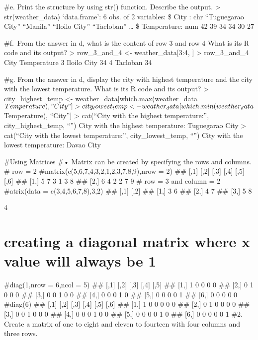 \documentclass[
]{article}
\begin{document}
\#e. Print the structure by using str() function. Describe the output.
\textgreater{} str(weather\_data) `data.frame': 6 obs. of 2 variables:
\$ City : chr ``Tuguegarao City'' ``Manila'' ``Iloilo City''
``Tacloban'' \ldots{} \$ Temperature: num 42 39 34 34 30 27

\#f.~From the answer in d, what is the content of row 3 and row 4 What
is its R code and its output? \textgreater{} row\_3\_and\_4 \textless-
weather\_data{[}3:4, {]} \textgreater{} row\_3\_and\_4 City Temperature
3 Iloilo City 34 4 Tacloban 34

\#g. From the answer in d, display the city with highest temperature and
the city with the lowest temperature. What is its R code and its output?
\textgreater{} city\_highest\_temp \textless-
weather\_data{[}which.max(weather\_data\(Temperature), "City"] > city_lowest_temp <- weather_data[which.min(weather_data\)Temperature),
``City''{]} \textgreater{} cat(``City with the highest temperature:'',
city\_highest\_temp, ``\n'') City with the highest temperature:
Tuguegarao City \textgreater{} cat(``City with the lowest
temperature:'', city\_lowest\_temp, ``\n'') City with the lowest
temperature: Davao City

\#Using Matrices \#• Matrix can be created by specifying the rows and
columns. \# row = 2 \#matrix(c(5,6,7,4,3,2,1,2,3,7,8,9),nrow = 2) \#\#
{[},1{]} {[},2{]} {[},3{]} {[},4{]} {[},5{]} {[},6{]} \#\# {[}1,{]} 5 7
3 1 3 8 \#\# {[}2,{]} 6 4 2 2 7 9 \# row = 3 and column = 2 \#atrix(data
= c(3,4,5,6,7,8),3,2) \#\# {[},1{]} {[},2{]} \#\# {[}1,{]} 3 6 \#\#
{[}2,{]} 4 7 \#\# {[}3,{]} 5 8

4

\hypertarget{creating-a-diagonal-matrix-where-x-value-will-always-be-1}{%
\section{creating a diagonal matrix where x value will always be
1}\label{creating-a-diagonal-matrix-where-x-value-will-always-be-1}}

\#diag(1,nrow = 6,ncol = 5) \#\# {[},1{]} {[},2{]} {[},3{]} {[},4{]}
{[},5{]} \#\# {[}1,{]} 1 0 0 0 0 \#\# {[}2,{]} 0 1 0 0 0 \#\# {[}3,{]} 0
0 1 0 0 \#\# {[}4,{]} 0 0 0 1 0 \#\# {[}5,{]} 0 0 0 0 1 \#\# {[}6,{]} 0
0 0 0 0 \#diag(6) \#\# {[},1{]} {[},2{]} {[},3{]} {[},4{]} {[},5{]}
{[},6{]} \#\# {[}1,{]} 1 0 0 0 0 0 \#\# {[}2,{]} 0 1 0 0 0 0 \#\#
{[}3,{]} 0 0 1 0 0 0 \#\# {[}4,{]} 0 0 0 1 0 0 \#\# {[}5,{]} 0 0 0 0 1 0
\#\# {[}6,{]} 0 0 0 0 0 1 \#2. Create a matrix of one to eight and
eleven to fourteen with four columns and three rows.
\end{document}
